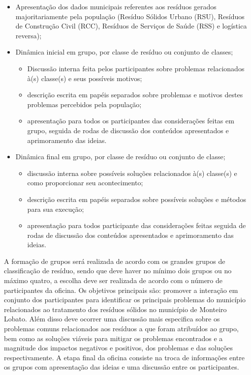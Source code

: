 \begin{itemize}
	\item Apresentação dos dados municipais referentes aos resíduos gerados majoritariamente pela população (Resíduo Sólidos Urbano (RSU), Resíduos de Construção Civil (RCC), Resíduos de Serviços de Saúde (RSS) e logística reversa);
	\item Dinâmica inicial em grupo, por classe de resíduo ou conjunto de classes;
	\begin{itemize}
	\item Discussão interna feita pelos participantes sobre problemas relacionados à(s) classe(s) e seus possíveis motivos;
	\item descrição escrita em papéis separados sobre problemas e motivos destes problemas percebidos pela população;
	\item apresentação para todos os participantes das considerações feitas em grupo, seguida de rodas de discussão dos conteúdos apresentados e aprimoramento das ideias.
	\end{itemize}
	\item Dinâmica final em grupo, por classe de resíduo ou conjunto de classe;
	\begin{itemize}
	\item discussão interna sobre possíveis soluções relacionados à(s) classe(s) e como proporcionar seu acontecimento;
	\item descrição escrita em papéis separados sobre possíveis soluções e métodos para sua execução;
	\item apresentação para todos participante das considerações feitas seguida de rodas de discussão dos conteúdos apresentados e aprimoramento das ideias.
	\end{itemize}
\end{itemize}

A formação de grupos será realizada de acordo com os grandes grupos de classificação de resíduo, sendo que deve haver no mínimo dois grupos ou no máximo quatro, a escolha deve ser realizada de acordo com o número de participantes da oficina. Os objetivos principais são: promover a interação em conjunto dos participantes para identificar os principais problemas do município relacionados ao tratamento dos resíduos sólidos no município de Monteiro Lobato. Além disso deve ocorrer uma discussão mais especifica sobre os problemas comuns relacionados aos resíduos a que foram atribuídos ao grupo, bem como as soluções viáveis para mitigar os problemas encontrados e a magnitude dos impactos negativos e positivos, dos problemas e das soluções respectivamente. A etapa final da oficina consiste na troca de informações entre os grupos com apresentação das ideias e uma discussão entre os participantes.


